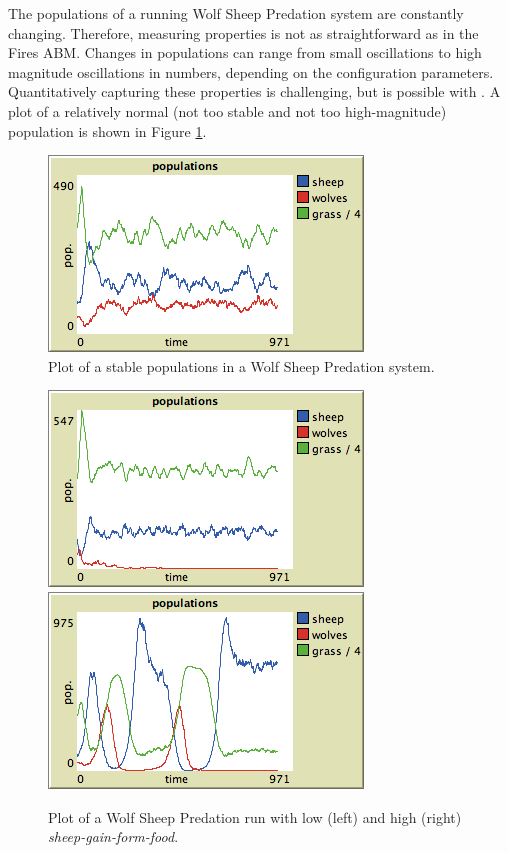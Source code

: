 The populations of a running Wolf Sheep Predation system are constantly changing.
Therefore, measuring properties is not as straightforward as in the Fires ABM.
Changes in populations can range from small oscillations to high magnitude oscillations in numbers, depending on the configuration parameters.
Quantitatively capturing these properties is challenging, but is possible with \fw.
A plot of a relatively normal (not too stable and not too high-magnitude) population is shown in Figure \ref{fig:wsp_norm}.

\begin{figure}[ht]
\centering
\includegraphics[scale=.666667]{images/wolfsheep/wolfsheep_normal.png}
\caption{Plot of a stable populations in a Wolf Sheep Predation system.}
\label{fig:wsp_norm}
\end{figure}


\begin{figure}[ht]
\centering
\includegraphics[scale=.666667]{images/wolfsheep/sheepfood_low.png}
\includegraphics[scale=.666667]{images/wolfsheep/sheepfood_high.png}
\caption{Plot of a Wolf Sheep Predation run with low (left) and high (right) \textit{sheep-gain-form-food}.}
\label{fig:wsp_sheepfood}
\end{figure}



